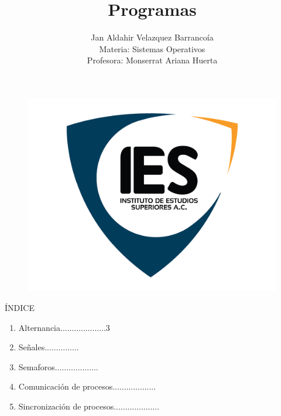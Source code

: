 \documentclass[11pt,a4paper]{report}
\author{Jan Aldahir Velazquez Barranco\'ia\\ Materia: Sistemas Operativos\\ Profesora: Monserrat Ariana Huerta}
\title{Programas}
\begin{document}
\begin{figure}[h]
\includegraphics[scale=0.3]{ies.jpg} 
\maketitle
\end{figure}
\clearpage

\begin{center}
\'INDICE

\begin{enumerate}

\item Alternancia....................3
\item Se\~{nales}...............
\item Semaforos...................
\item Comunicaci\'on de procesos...................
\item Sincronizaci\'on de procesos....................
\end{enumerate}
\end{center}

\clearpage
\end{document}
